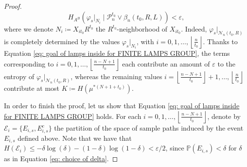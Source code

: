 \documentclass[reqno,oneside,11pt]{amsart}
\renewcommand{\P}{\mathbb{P}}
\theoremstyle{plain}
\theoremstyle{definition}
\begin{document}
\begin{proof}
	\begin{equation}\label{eq: goal of lamps inside for FINITE LAMPS GROUP}
		H_{A^B}\left( \varphi_{s}|_{N_i} \mid \mathcal{P}_n^{t_0}\vee\beta_n(t_0,R,L) \right)<\varepsilon, 
	\end{equation}
	where we denote $N_i\coloneqq X_{it_0}R^{t_0}$ the $R^{t_0}$-neighborhood of $X_{it_0}$. Indeed, $\varphi_{s}|_{\mathcal{N}_n(t_0,R)}$ is completely determined by the values $\varphi_{s}|_{N_i}$, with $i=0,1,\ldots, \left\lfloor\frac{n}{t_0}\right\rfloor$. Thanks to Equation \eqref{eq: goal of lamps inside for FINITE LAMPS GROUP}, the terms corresponding to $i=0,1,\ldots, \left\lfloor\frac{n-N+1}{t_0}\right\rfloor$ each contribute an amount of $\varepsilon$ to the entropy of $\varphi_{s}|_{\mathcal{N}_n(t_0,R)}$, whereas the remaining values $i= \left\lfloor\frac{n-N+1}{t_0}\right\rfloor+1, \ldots, \left\lfloor\frac{n}{t_0}\right\rfloor$ contribute at most $K\coloneqq H\left(\mu^{*(N+1+t_0)}\right)$.
	
	In order to finish the proof, let us show that Equation \eqref{eq: goal of lamps inside for FINITE LAMPS GROUP} holds. For each $i=0,1,\ldots, \left\lfloor\frac{n-N+1}{t_0}\right\rfloor$, denote by $\mathcal{E}_i=\{E_{i,s},E_{i,s}^c\}$ the partition of the space of sample paths induced by the event $E_{i,s}$ defined above. Note that we have that $H(\mathcal{E}_i)\le -\delta\log(\delta)-(1-\delta)\log(1-\delta)<\varepsilon/2$,  since $\P(E_{i,s})<\delta$ for $\delta$ as in Equation \eqref{eq: choice of delta}. 
	

\end{proof}
\end{document}
